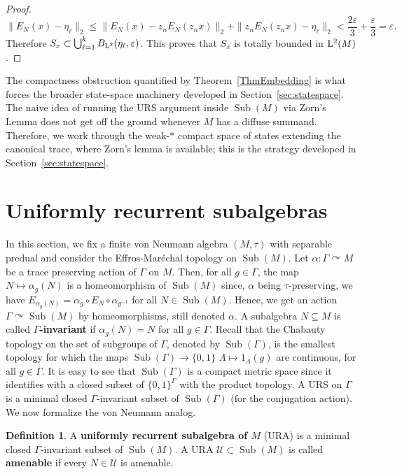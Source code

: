 \documentclass[12pt]{amsart} %
\theoremstyle{plain}
\theoremstyle{definition}
\newtheorem{definition}[theorem]{Definition}
\newcommand{\LL}{{\rm L}}
\DeclareMathOperator{\Sub}{Sub}
\begin{document}
\begin{proof}
$$\|E_N(x)-\eta_\ell\|_2\leq\|E_N(x)-z_nE_N(z_nx)\|_2+\|z_nE_N(z_nx)-\eta_\ell\|_2 <\frac{2\varepsilon}{3}+ \frac{\varepsilon}{3}=\varepsilon.$$
Therefore $S_x\subset\bigcup_{\ell=1}^k B_{\LL^2}(\eta_\ell,\varepsilon)$. This proves that \(S_x\) is totally bounded in \(\LL^2(M)\).\end{proof}
The compactness obstruction quantified by Theorem~\ref{ThmEmbedding} is what forces the broader state-space machinery developed in Section~\ref{sec:statespace}. The naive idea of running the URS argument inside $\Sub(M)$ via Zorn's Lemma does not get off the ground whenever $M$ has a diffuse summand. Therefore, we work through the weak-$*$ compact space of states extending the canonical trace, where Zorn's lemma is available; this is the strategy developed in Section~\ref{sec:statespace}.
\section{Uniformly recurrent subalgebras}
\label{sec:URA}
In this section, we fix a finite von Neumann algebra $(M,\tau)$ with separable predual and consider the Effros-Mar\'echal topology on $\Sub(M)$. Let $\alpha:\Gamma\curvearrowright M$ be a trace preserving action of $\Gamma$ on $M$. Then, for all $g\in\Gamma$, the map $N\mapsto\alpha_g(N)$ is a homeomorphism of $\Sub(M)$ since, $\alpha$ being $\tau$-preserving, we have $E_{\alpha_g(N)}=\alpha_g\circ E_N\circ\alpha_{g^{-1}}$ for all $N\in\Sub(M)$. Hence, we get an action $\Gamma\curvearrowright\Sub(M)$ by homeomorphisms, still denoted $\alpha$. A subalgebra $N\subseteq M$ is called \textbf{$\Gamma$-invariant} if $\alpha_g(N)=N$ for all $g\in\Gamma$.
Recall that the Chabauty topology on the set of subgroups of $\Gamma$, denoted by $\Sub(\Gamma)$, is the smallest topology for which the maps $\Sub(\Gamma)\rightarrow\{0,1\}$ $\Lambda\mapsto 1_\Lambda(g)$ are continuous, for all $g\in\Gamma$. It is easy to see that $\Sub(\Gamma)$ is a compact metric space since it identifies with a closed subset of $\{0,1\}^\Gamma$ with the product topology. A URS on $\Gamma$ is a minimal closed $\Gamma$-invariant subset of $\Sub(\Gamma)$ (for the conjugation action). We now formalize the von Neumann analog.
\begin{definition} A \textbf{uniformly recurrent subalgebra of $M$} (URA) is a minimal closed $\Gamma$-invariant subset of $\Sub(M)$. A URA $\mathcal{U}\subset\Sub(M)$ is called \textbf{amenable} if every $N\in\mathcal{U}$ is amenable.
\end{definition}
\end{document}
